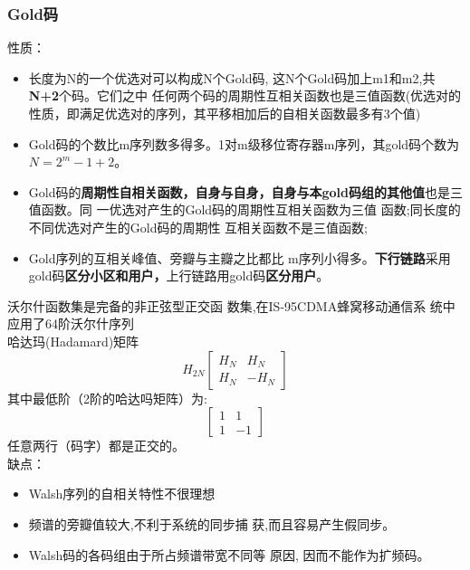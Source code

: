 \subsubsection{Gold码}
性质：
\begin{itemize}
	\item 长度为N的一个优选对可以构成N个Gold码,
	这N个Gold码加上m1和m2,共\textbf{N+2}个码。它们之中
	任何两个码的周期性互相关函数也是三值函数(优选对的性质，即满足优选对的序列，其平移相加后的自相关函数最多有3个值)
	\item  Gold码的个数比m序列数多得多。1对m级移位寄存器m序列，其gold码个数为$ N = 2^m-1 + 2 $。
	\item Gold码的\textbf{周期性自相关函数，自身与自身，自身与本gold码组的其他值}也是三值函数。同
	一优选对产生的Gold码的周期性互相关函数为三值
	函数;同长度的不同优选对产生的Gold码的周期性
	互相关函数不是三值函数;
	\item  Gold序列的互相关峰值、旁瓣与主瓣之比都比
	m序列小得多。\textbf{下行链路}采用gold码\textbf{区分小区和用户，}上行链路用gold码\textbf{区分用户}。
\end{itemize}
沃尔什函数集是完备的非正弦型正交函
数集,在IS-95CDMA蜂窝移动通信系
统中应用了64阶沃尔什序列\\
哈达玛(Hadamard)矩阵
\[H_{2N} \begin{bmatrix}
	H_{N} & H_{N} \\ 
	H_{N} & -H_{N}
\end{bmatrix}  \]
其中最低阶（2阶的哈达吗矩阵）为:
\[ 
\begin{bmatrix}
1 & 1 \\ 
1 & -1
\end{bmatrix} 
 \]
 任意两行（码字）都是正交的。\\
 
 缺点：
 \begin{itemize}
 	\item Walsh序列的自相关特性不很理想
 	\item 频谱的旁瓣值较大,不利于系统的同步捕
 	获,而且容易产生假同步。
 	\item Walsh码的各码组由于所占频谱带宽不同等
 	原因, 因而不能作为扩频码。
 \end{itemize}
